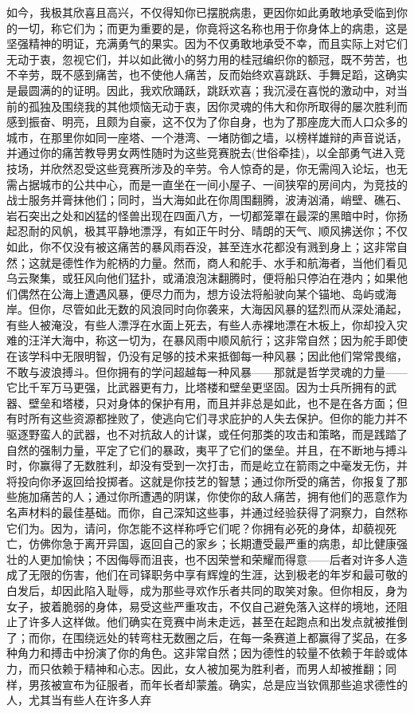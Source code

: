 如今，我极其欣喜且高兴，不仅得知你已摆脱病患，更因你如此勇敢地承受临到你的一切，称它们为；而更为重要的是，你竟将这名称也用于你身体上的病患，这是坚强精神的明证，充满勇气的果实。因为不仅勇敢地承受不幸，而且实际上对它们无动于衷，忽视它们，并以如此微小的努力用的桂冠编织你的额冠，既不劳苦，也不辛劳，既不感到痛苦，也不使他人痛苦，反而始终欢喜跳跃、手舞足蹈，这确实是最圆满的的证明。因此，我欢欣踊跃，跳跃欢喜；我沉浸在喜悦的激动中，对当前的孤独及围绕我的其他烦恼无动于衷，因你灵魂的伟大和你所取得的屡次胜利而感到振奋、明亮，且颇为自豪，这不仅为了你自身，也为了那座庞大而人口众多的城市，在那里你如同一座塔、一个港湾、一堵防御之墙，以榜样雄辩的声音说话，并通过你的痛苦教导男女两性随时为这些竞赛脱去(世俗牵挂)，以全部勇气进入竞技场，并欣然忍受这些竞赛所涉及的辛劳。令人惊奇的是，你无需闯入论坛，也无需占据城市的公共中心，而是一直坐在一间小屋子、一间狭窄的房间内，为竞技的战士服务并膏抹他们；同时，当大海如此在你周围翻腾，波涛汹涌，峭壁、礁石、岩石突出之处和凶猛的怪兽出现在四面八方，一切都笼罩在最深的黑暗中时，你扬起忍耐的风帆，极其平静地漂浮，有如正午时分、晴朗的天气、顺风拂送你；不仅如此，你不仅没有被这痛苦的暴风雨吞没，甚至连水花都没有溅到身上；这非常自然；这就是德性作为舵柄的力量。然而，商人和舵手、水手和航海者，当他们看见乌云聚集，或狂风向他们猛扑，或涌浪泡沫翻腾时，便将船只停泊在港内；如果他们偶然在公海上遭遇风暴，便尽力而为，想方设法将船驶向某个锚地、岛屿或海岸。但你，尽管如此无数的风浪同时向你袭来，大海因风暴的猛烈而从深处涌起，有些人被淹没，有些人漂浮在水面上死去，有些人赤裸地漂在木板上，你却投入灾难的汪洋大海中，称这一切为，在暴风雨中顺风航行；这非常自然；因为舵手即使在该学科中无限明智，仍没有足够的技术来抵御每一种风暴；因此他们常常畏缩，不敢与波浪搏斗。但你拥有的学问超越每一种风暴——那就是哲学灵魂的力量——它比千军万马更强，比武器更有力，比塔楼和壁垒更坚固。因为士兵所拥有的武器、壁垒和塔楼，只对身体的保护有用，而且并非总是如此，也不是在各方面；但有时所有这些资源都挫败了，使逃向它们寻求庇护的人失去保护。但你的能力并不驱逐野蛮人的武器，也不对抗敌人的计谋，或任何那类的攻击和策略，而是践踏了自然的强制力量，平定了它们的暴政，夷平了它们的堡垒。并且，在不断地与搏斗时，你赢得了无数胜利，却没有受到一次打击，而是屹立在箭雨之中毫发无伤，并将投向你矛返回给投掷者。这就是你技艺的智慧；通过你所受的痛苦，你报复了那些施加痛苦的人；通过你所遭遇的阴谋，你使你的敌人痛苦，拥有他们的恶意作为名声材料的最佳基础。而你，自己深知这些事，并通过经验获得了洞察力，自然称它们为。因为，请问，你怎能不这样称呼它们呢？你拥有必死的身体，却藐视死亡，仿佛你急于离开异国，返回自己的家乡；长期遭受最严重的病患，却比健康强壮的人更加愉快；不因侮辱而沮丧，也不因荣誉和荣耀而得意——后者对许多人造成了无限的伤害，他们在司铎职务中享有辉煌的生涯，达到极老的年岁和最可敬的白发后，却因此陷入耻辱，成为那些寻欢作乐者共同的取笑对象。但你相反，身为女子，披着脆弱的身体，易受这些严重攻击，不仅自己避免落入这样的境地，还阻止了许多人这样做。他们确实在竞赛中尚未走远，甚至在起跑点和出发点就被推倒了；而你，在围绕远处的转弯柱无数圈之后，在每一条赛道上都赢得了奖品，在多种角力和搏击中扮演了你的角色。这非常自然；因为德性的较量不依赖于年龄或体力，而只依赖于精神和心志。因此，女人被加冕为胜利者，而男人却被推翻；同样，男孩被宣布为征服者，而年长者却蒙羞。确实，总是应当钦佩那些追求德性的人，尤其当有些人在许多人弃